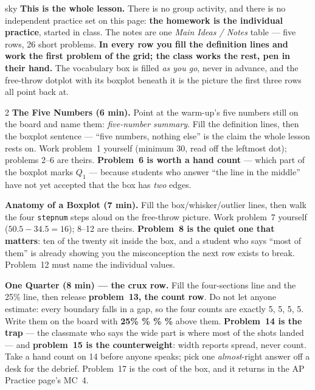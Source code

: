 \documentclass[10pt]{article}
\begin{document}
\boxguard
\begin{skillbox}{sky}
\textbf{This is the whole lesson.} There is no group activity, and there is no independent
practice set on this page: \textbf{the homework is the individual practice}, started in class.
The notes are one \emph{Main Ideas / Notes} table --- five rows, 26 short problems. \textbf{In
every row you fill the definition lines and work the first problem of the grid; the class works
the rest, pen in their hand.} The vocabulary box is filled \emph{as you go}, never in advance,
and the free-throw dotplot with its boxplot beneath it is the picture the first three rows all
point back at.
\begin{multicols}{2}
\textbf{The Five Numbers (6 min).} Point at the warm-up's five numbers still on the board and
name them: \emph{five-number summary}. Fill the definition lines, then the boxplot sentence ---
``five numbers, nothing else'' is the claim the whole lesson rests on. Work problem~1 yourself
(minimum 30, read off the leftmost dot); problems 2--6 are theirs. \textbf{Problem~6 is worth a
hand count} --- which part of the boxplot marks $Q_1$ --- because students who answer ``the line
in the middle'' have not yet accepted that the box has \emph{two} edges.

\textbf{Anatomy of a Boxplot (7 min).} Fill the box/whisker/outlier lines, then walk the four
\texttt{stepnum} steps aloud on the free-throw picture. Work problem~7 yourself ($50.5 - 34.5 =
16$); 8--12 are theirs. \textbf{Problem~8 is the quiet one that matters}: ten of the twenty sit
inside the box, and a student who says ``most of them'' is already showing you the misconception
the next row exists to break. Problem~12 must name the individual values.

\textbf{One Quarter (8 min) --- the crux row.} Fill the four-sections line and the 25\% line,
then release \textbf{problem~13, the count row}. Do not let anyone estimate: every boundary falls
in a gap, so the four counts are exactly 5, 5, 5, 5. Write them on the board with
\textbf{25\% \% \% \%} above them. \textbf{Problem~14 is the trap} --- the
classmate who says the wide part is where most of the shots landed --- and \textbf{problem~15 is
the counterweight}: width reports spread, never count. Take a hand count on 14 before anyone
speaks; pick one \emph{almost}-right answer off a desk for the debrief. Problem~17 is the cost of
the box, and it returns in the AP Practice page's MC~4.


\end{multicols}
\end{skillbox}
\end{document}
